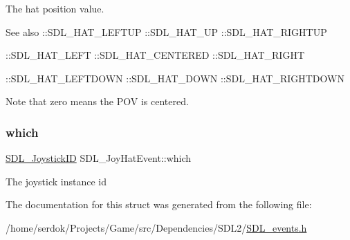 The hat position value. \begin{DoxySeeAlso}{See also}
\+::\+S\+D\+L\+\_\+\+H\+A\+T\+\_\+\+L\+E\+F\+T\+UP \+::\+S\+D\+L\+\_\+\+H\+A\+T\+\_\+\+UP \+::\+S\+D\+L\+\_\+\+H\+A\+T\+\_\+\+R\+I\+G\+H\+T\+UP 

\+::\+S\+D\+L\+\_\+\+H\+A\+T\+\_\+\+L\+E\+FT \+::\+S\+D\+L\+\_\+\+H\+A\+T\+\_\+\+C\+E\+N\+T\+E\+R\+ED \+::\+S\+D\+L\+\_\+\+H\+A\+T\+\_\+\+R\+I\+G\+HT 

\+::\+S\+D\+L\+\_\+\+H\+A\+T\+\_\+\+L\+E\+F\+T\+D\+O\+WN \+::\+S\+D\+L\+\_\+\+H\+A\+T\+\_\+\+D\+O\+WN \+::\+S\+D\+L\+\_\+\+H\+A\+T\+\_\+\+R\+I\+G\+H\+T\+D\+O\+WN
\end{DoxySeeAlso}
Note that zero means the P\+OV is centered. \mbox{\label{structSDL__JoyHatEvent_ac9d9bb179f9116d16b3da47cacd74b55}} 
\subsubsection{\texorpdfstring{which}{which}}
{\footnotesize\ttfamily \hyperlink{SDL__joystick_8h_a3c3d32500cb08f76ee8077983912c0bd}{S\+D\+L\+\_\+\+Joystick\+ID} S\+D\+L\+\_\+\+Joy\+Hat\+Event\+::which}

The joystick instance id 

The documentation for this struct was generated from the following file\+:\begin{DoxyCompactItemize}
\item 
/home/serdok/\+Projects/\+Game/src/\+Dependencies/\+S\+D\+L2/\hyperlink{SDL__events_8h}{S\+D\+L\+\_\+events.\+h}\end{DoxyCompactItemize}
